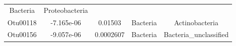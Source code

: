 \documentclass[]{article}
\begin{document}
\begin{longtable}[]{@{}ccccc@{}}
\begin{minipage}[t]{0.13\columnwidth}
Bacteria\strut
\end{minipage} & \begin{minipage}[t]{0.27\columnwidth}\centering\strut
Proteobacteria\strut
\end{minipage}\tabularnewline
\begin{minipage}[t]{0.13\columnwidth}\centering\strut
Otu00118\strut
\end{minipage} & \begin{minipage}[t]{0.16\columnwidth}\centering\strut
-7.165e-06\strut
\end{minipage} & \begin{minipage}[t]{0.14\columnwidth}\centering\strut
0.01503\strut
\end{minipage} & \begin{minipage}[t]{0.13\columnwidth}\centering\strut
Bacteria\strut
\end{minipage} & \begin{minipage}[t]{0.27\columnwidth}\centering\strut
Actinobacteria\strut
\end{minipage}\tabularnewline
\begin{minipage}[t]{0.13\columnwidth}\centering\strut
Otu00156\strut
\end{minipage} & \begin{minipage}[t]{0.16\columnwidth}\centering\strut
-9.057e-06\strut
\end{minipage} & \begin{minipage}[t]{0.14\columnwidth}\centering\strut
0.0002607\strut
\end{minipage} & \begin{minipage}[t]{0.13\columnwidth}\centering\strut
Bacteria\strut
\end{minipage} & \begin{minipage}[t]{0.27\columnwidth}\centering\strut
Bacteria\_unclassified\strut
\end{minipage}\tabularnewline
\bottomrule
\end{longtable}
\end{document}
